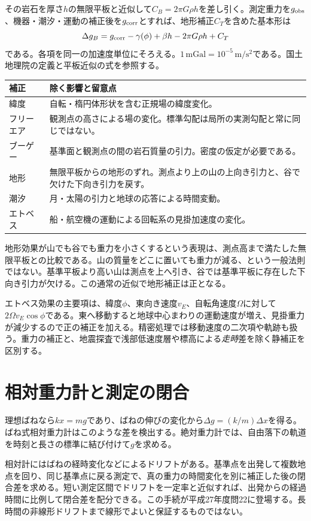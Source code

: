 その岩石を厚さ\(h\)の無限平板と近似して\(C_B=2\pi G\rho h\)を差し引く。測定重力を\(g_{\rm obs}\)、機器・潮汐・運動の補正後を\(g_{\rm corr}\)とすれば、地形補正\(C_T\)を含めた基本形は
\[
 \Delta g_B=g_{\rm corr}-\gamma(\phi)+\beta h-2\pi G\rho h+C_T
\]
である。各項を同一の加速度単位にそろえる。\(1\,\mathrm{mGal}=10^{-5}\,\mathrm{m/s^2}\)である。国土地理院の定義と平板近似の式を参照する\cite{gsi_gravity_definitions}。

\begin{longtable}{p{}p{}}
\hline
補正 & 除く影響と留意点\\\hline
緯度 & 自転・楕円体形状を含む正規場の緯度変化。\\
フリーエア & 観測点の高さによる場の変化。標準勾配は局所の実測勾配と常に同じではない。\\
ブーゲー & 基準面と観測点の間の岩石質量の引力。密度の仮定が必要である。\\
地形 & 無限平板からの地形のずれ。測点より上の山の上向き引力と、谷で欠けた下向き引力を戻す。\\
潮汐 & 月・太陽の引力と地球の応答による時間変動。\\
エトベス & 船・航空機の運動による回転系の見掛加速度の変化。\\
\hline
\end{longtable}

地形効果が山でも谷でも重力を小さくするという表現は、測点高まで満たした無限平板との比較である。山の質量をどこに置いても重力が減る、という一般法則ではない。基準平板より高い山は測点を上へ引き、谷では基準平板に存在した下向き引力が欠ける。この通常の近似で地形補正は正となる。

エトベス効果の主要項は、緯度\(\phi\)、東向き速度\(v_E\)、自転角速度\(\Omega\)に対して\(2\Omega v_E\cos\phi\)である。東へ移動すると地球中心まわりの運動速度が増え、見掛重力が減少するので正の補正を加える。精密処理では移動速度の二次項や軌跡も扱う。重力の補正と、地震探査で浅部低速度層や標高による\emph{走時}差を除く静補正を区別する。

\section{相対重力計と測定の閉合}
\label{theory:gravity:measurement}
理想ばねなら\(kx=mg\)であり、ばねの伸びの変化から\(\Delta g=(k/m)\Delta x\)を得る。ばね式相対重力計はこのような差を検出する。絶対重力計では、自由落下の軌道を時刻と長さの標準に結び付けて\(g\)を求める。

相対計にはばねの経時変化などによるドリフトがある。基準点を出発して複数地点を回り、同じ基準点に戻る測定で、真の重力の時間変化を別に補正した後の閉合差を求める。短い測定区間でドリフトを一定率と近似すれば、出発からの経過時間に比例して閉合差を配分できる。この手続が平成27年度問22に登場する。長時間の非線形ドリフトまで線形でよいと保証するものではない。

